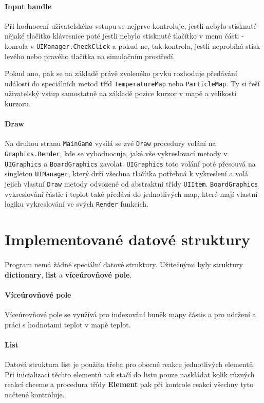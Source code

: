 \documentclass[a4paper, 12pt]{article}
\begin{document}
\paragraph{Input handle}
Při hodnocení uživatelského vstupu se nejprve kontroluje, jestli nebylo
stisknuté nějaké tlačítko klávesnice poté jestli nebylo stisknuté tlačítko v
menu části - konrola v \texttt{UIManager.CheckClick} a pokud ne, tak kontrola,
jestli neprobíhá stisk levého nebo pravého tlačítka na simulačním prostředí.

Pokud ano, pak se na základě právě zvoleného prvku rozhoduje předávání události
do speciálních metod tříd \texttt{TemperatureMap} nebo \texttt{ParticleMap}.
Ty si řeší uživatelský vstup samostatně na základě pozice kurzor v mapě a
velikosti kurzoru.

\paragraph{Draw}
Na druhou stranu \texttt{MainGame} vysílá se zvé \texttt{Draw} procedury volání
na \texttt{Graphics.Render}, kde se vyhodnocuje, jaké vše vykreslovací metody v
\texttt{UIGraphics} a \texttt{BoardGraphics} zavolat. \texttt{UIGraphics} toto
volání poté přesouvá na singleton \texttt{UIManager}, který drží všechna
tlačítka potřebná k vykreslení a volá jejich vlastní \texttt{Draw} metody
odvozené od abstraktní třídy \texttt{UIItem}.
\texttt{BoardGraphics} vykreslování částic i teplot také předává do
jednotlivých map, které mají vlastní logiku vykreslování ve svých
\texttt{Render} funkcích.

\newpage
\section{Implementované datové struktury}
\paragraph{}
Program nemá žádné speciální datové struktury. Užitečnými byly struktury
\textbf{dictionary}, \textbf{list} a \textbf{víceúrovňové pole}.

\paragraph{Víceúrovňové pole}
Víceúrovňové pole se využívá pro indexování buněk mapy částis a pro udržení a
práci s hodnotami teplot v mapě teplot.

\paragraph{List}
Datová struktura list je použita třeba pro obecné reakce jednotlivých elementů.
Při inicializaci těchto elementů tak stačí do listu pouze naskládat kolik
různých reakcí chceme a procedura třídy \textbf{Element} pak při kontrole
reakcí všechny tyto načtené kontroluje.
\end{document}
